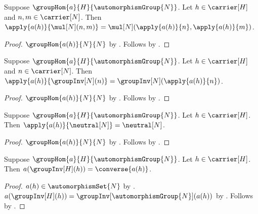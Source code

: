 \begin{proposition}\label{semidirect_action_preserves_mul}
    Suppose $\groupHom{a}{H}{\automorphismGroup{N}}$.
    Let $h\in\carrier[H]$ and $n,m\in\carrier[N]$.
    Then
        $\apply{a(h)}{\mul[N](n,m)}=
            \mul[N](\apply{a(h)}{n},\apply{a(h)}{m})$.
\end{proposition}
\begin{proof}
    $\groupHom{a(h)}{N}{N}$ by
        .
    Follows by .
\end{proof}

\begin{proposition}\label{semidirect_action_preserves_inverse}
    Suppose $\groupHom{a}{H}{\automorphismGroup{N}}$.
    Let $h\in\carrier[H]$ and $n\in\carrier[N]$.
    Then
        $\apply{a(h)}{\groupInv[N](n)}=
            \groupInv[N](\apply{a(h)}{n})$.
\end{proposition}
\begin{proof}
    $\groupHom{a(h)}{N}{N}$ by
        .
    Follows by .
\end{proof}

\begin{proposition}\label{semidirect_action_preserves_neutral}
    Suppose $\groupHom{a}{H}{\automorphismGroup{N}}$.
    Let $h\in\carrier[H]$.
    Then $\apply{a(h)}{\neutral[N]}=\neutral[N]$.
\end{proposition}
\begin{proof}
    $\groupHom{a(h)}{N}{N}$ by
        .
    Follows by .
\end{proof}

\begin{proposition}\label{semidirect_action_inverse_graph}
    Suppose $\groupHom{a}{H}{\automorphismGroup{N}}$.
    Let $h\in\carrier[H]$.
    Then $a(\groupInv[H](h))=\converse{a(h)}$.
\end{proposition}
\begin{proof}
    $a(h)\in\automorphismSet{N}$ by
        .
    $a(\groupInv[H](h))=
        \groupInv[\automorphismGroup{N}](a(h))$ by
        .
    Follows by .
\end{proof}

